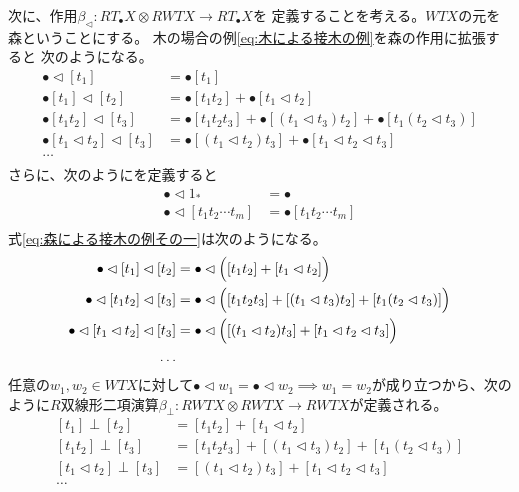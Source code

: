 			次に、作用$\beta_\lhd:RT_\bullet X\otimes RWTX\to RT_\bullet X$を
			定義することを考える。$WTX$の元を森ということにする。
			木の場合の例\eqref{eq:木による接木の例}を森の作用に拡張すると
			次のようになる。
			\begin{equation}\label{eq:森による接木の例その一}\begin{split} %
				\bullet\lhd[t_1] &= \bullet[t_1] \\
				\bullet[t_1]\lhd[t_2] &= \bullet[t_1t_2] + \bullet[t_1\lhd t_2] \\
				\bullet[t_1t_2]\lhd[t_3] &= \bullet[t_1t_2t_3] + \bullet[(t_1\lhd t_3)t_2] + \bullet[t_1(t_2\lhd t_3)] \\
				\bullet[t_1\lhd t_2]\lhd[t_3] &= \bullet[(t_1\lhd t_2)t_3] + \bullet[t_1\lhd t_2\lhd t_3] \\
				\dots \\
			\end{split}\end{equation} %
			さらに、次のようにを定義すると
			\begin{equation*}\begin{split} %
				\bullet\lhd1_* &= \bullet \\
				\bullet\lhd[t_1t_2\cdots t_m] &= \bullet[t_1t_2\cdots t_m] \\
			\end{split}\end{equation*} %
			式\eqref{eq:森による接木の例その一}は次のようになる。
			\begin{equation*}\begin{split} %
				\bullet\lhd[t_1]\lhd[t_2] 
				&= \bullet\lhd\Bigl([t_1t_2]+[t_1\lhd t_2]\Bigr) \\
				\bullet\lhd[t_1t_2]\lhd[t_3] 
				&= \bullet\lhd\Bigl([t_1t_2t_3]+[(t_1\lhd t_3)t_2]+[t_1(t_2\lhd t_3)]\Bigr) \\
				\bullet\lhd[t_1\lhd t_2]\lhd[t_3] 
				&= \bullet\lhd\Bigl([(t_1\lhd t_2)t_3]+[t_1\lhd t_2\lhd t_3]\Bigr) \\
				\dots \\
			\end{split}\end{equation*} %
			任意の$w_1,w_2\in WTX$に対して$
			\bullet\lhd w_1=\bullet\lhd w_2 \implies w_1=w_2
			$が成り立つから、次のように$R$双線形二項演算$
			\beta_\perp:RWTX\otimes RWTX\to RWTX
			$が定義される。
			\begin{equation*}\begin{split} %
				[t_1]\perp[t_2] &= [t_1t_2]+[t_1\lhd t_2] \\
				[t_1t_2]\perp[t_3] 
				&= [t_1t_2t_3]+[(t_1\lhd t_3)t_2]+[t_1(t_2\lhd t_3)] \\
				[t_1\lhd t_2]\perp[t_3]
				&= [(t_1\lhd t_2)t_3]+[t_1\lhd t_2\lhd t_3] \\
				\dots \\
			\end{split}\end{equation*} %
